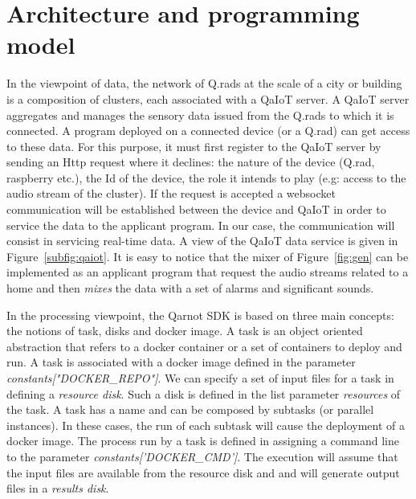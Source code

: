 \documentclass[10pt, conference, compsocconf]{IEEEtran}
\begin{document}
\section{Architecture and programming model} \label{Model}

In the viewpoint of data, the network of Q.rads at the scale of a city or building is a composition of clusters, each 
associated with a QaIoT server. A QaIoT server aggregates and manages the sensory data issued from the Q.rads to which it is 
connected. A program deployed on a connected device (or a Q.rad) can get access to these data. For this purpose, 
it must first register to the QaIoT server by sending an Http request where it declines: the nature of the device (Q.rad, 
raspberry etc.), the Id of the device, the role it intends to play (e.g: access to the audio stream of the cluster). If the 
request is accepted a websocket communication will be established between the device and QaIoT in order to service the data
to the applicant program. In our case, the communication will consist in servicing real-time data.
A view of the QaIoT data service is given in Figure~\ref{subfig:qaiot}. 
It is easy to notice that the mixer of Figure~\ref{fig:gen} can be implemented as an applicant program that request the audio streams  
related to a home and then {\it mixes} the data with a set of alarms and significant sounds.

In the processing viewpoint, the Qarnot SDK is based on three main concepts: the notions of task, 
disks and docker image. A task is an object oriented abstraction that refers to a 
docker container or a set of containers to deploy and run. A task is associated with a docker image defined in the 
parameter {\it constants["DOCKER\_REPO"]}. We can specify a set of input files for a task in defining a {\it resource disk}. 
Such a disk is defined in the list parameter {\it resources} of the task. 
A task has a name and can be composed by subtasks (or parallel instances).  
In these cases, the run of each subtask will cause the deployment of a docker image. The process run by a task is defined in 
assigning a command line to the parameter {\it constants['DOCKER\_CMD']}. The execution will assume that the input 
files are available from the resource disk and and will generate output files in a {\it results disk}.
\end{document}
